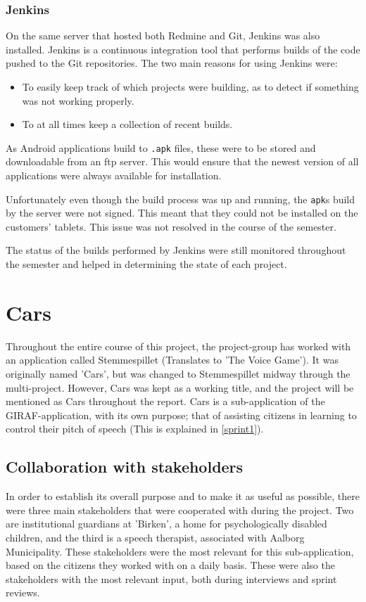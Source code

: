 \subsubsection{Jenkins}
On the same server that hosted both Redmine and Git, Jenkins was also installed.
Jenkins is a continuous integration tool that performs builds of the code pushed to the Git repositories.
The two main reasons for using Jenkins were:
\begin{itemize}
\item To easily keep track of which projects were building, as to detect if something was not working properly.
\item To at all times keep a collection of recent builds.
\end{itemize}
As Android applications build to \texttt{.apk} files, these were to be stored and downloadable from an ftp server.
This would ensure that the newest version of all applications were always available for installation.

Unfortunately even though the build process was up and running, the \texttt{apk}s build by the server were not signed.
This meant that they could not be installed on the customers' tablets.
This issue was not resolved in the course of the semester.

The status of the builds performed by Jenkins were still monitored throughout the semester and helped in determining the state of each project.

\section{Cars}
Throughout the entire course of this project, the project-group has worked with an application called Stemmespillet (Translates to 'The Voice Game').
It was originally named 'Cars', but was changed to Stemmespillet midway through the multi-project.
However, Cars was kept as a working title, and the project will be mentioned as Cars throughout the report.
Cars is a sub-application of the GIRAF-application, with its own purpose; that of assisting citizens in learning to control their pitch of speech (This is explained in \cref{sprint1}).

\subsection{Collaboration with stakeholders}
In order to establish its overall purpose and to make it as useful as possible, there were three main stakeholders that were cooperated with during the project.
Two are institutional guardians at 'Birken', a home for psychologically disabled children, and the third is a speech therapist, associated with Aalborg Municipality.
These stakeholders were the most relevant for this sub-application, based on the citizens they worked with on a daily basis.
These were also the stakeholders with the most relevant input, both during interviews and sprint reviews.

